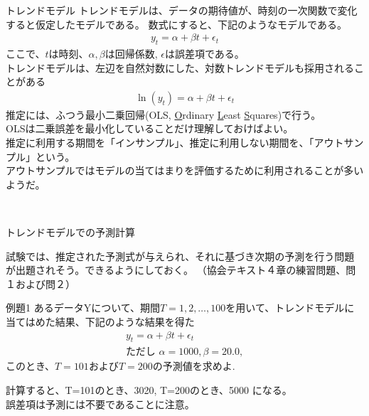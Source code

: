 \documentclass[dvipdfmx,autodetect-engine, unicode, 10pt, aspectratio=169]{beamer}
\begin{document}
\begin{frame}{トレンドモデル}
    トレンドモデルは、データの期待値が、時刻の一次関数で変化すると仮定したモデルである。
    数式にすると、下記のようなモデルである。 
    \begin{align*}
        y_t = \alpha + \beta t + \epsilon_t
    \end{align*}
    ここで、$t$は時刻、$\alpha, \beta$は回帰係数, $\epsilon$は誤差項である。\\
    トレンドモデルは、左辺を自然対数にした、対数トレンドモデルも採用されることがある
    \begin{align*}
        \ln(y_t) = \alpha + \beta t + \epsilon_t
    \end{align*}
    推定には、ふつう最小二乗回帰(OLS, \underline{O}rdinary \underline{L}east \underline{S}quares)で行う。\\
    OLSは二乗誤差を最小化していることだけ理解しておけばよい。\\
    \footnotesize 推定に利用する期間を「インサンプル」、推定に利用しない期間を、「アウトサンプル」という。\\
    アウトサンプルではモデルの当てはまりを評価するために利用されることが多いようだ。
    \begin{center}
         \\
    \end{center}

\end{frame}
\begin{frame}{トレンドモデルでの予測計算}

    試験では、推定された予測式が与えられ、それに基づき次期の予測を行う問題が出題されそう。できるようにしておく。
    （協会テキスト４章の練習問題、問１および問２）
    \begin{itembox}[i]{例題1}
        あるデータYについて、期間$T=1,2,\dotsc , 100$を用いて、トレンドモデルに当てはめた結果、下記のような結果を得た
        \begin{align*}
            y_t = \alpha + \beta t + \epsilon_t \\
            \text{ただし  } \alpha = 1000, \beta = 20.0, 
        \end{align*}
        このとき、$T=101$および$T=200$の予測値を求めよ.
    \end{itembox}
    計算すると、T=101のとき、3020, T=200のとき、5000 になる。\\
    誤差項は予測には不要であることに注意。
\end{frame}
\end{document}
